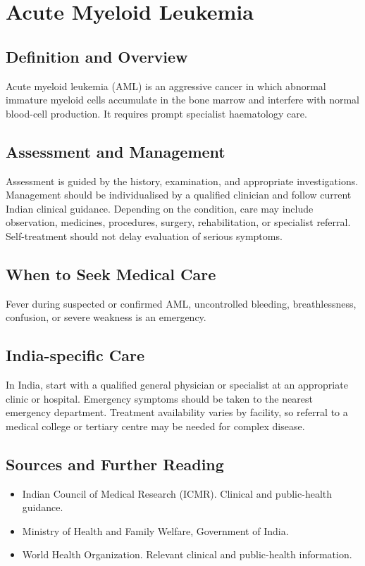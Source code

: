 \chapter{Acute Myeloid Leukemia}

\section*{Definition and Overview}
Acute myeloid leukemia (AML) is an aggressive cancer in which abnormal immature myeloid cells accumulate in the bone marrow and interfere with normal blood-cell production. It requires prompt specialist haematology care.

\section*{Assessment and Management}
Assessment is guided by the history, examination, and appropriate investigations. Management should be individualised by a qualified clinician and follow current Indian clinical guidance. Depending on the condition, care may include observation, medicines, procedures, surgery, rehabilitation, or specialist referral. Self-treatment should not delay evaluation of serious symptoms.

\section*{When to Seek Medical Care}
Fever during suspected or confirmed AML, uncontrolled bleeding, breathlessness, confusion, or severe weakness is an emergency.

\section*{India-specific Care}
In India, start with a qualified general physician or specialist at an appropriate clinic or hospital. Emergency symptoms should be taken to the nearest emergency department. Treatment availability varies by facility, so referral to a medical college or tertiary centre may be needed for complex disease.

\section*{Sources and Further Reading}
\begin{itemize}
    \item Indian Council of Medical Research (ICMR). Clinical and public-health guidance.
    \item Ministry of Health and Family Welfare, Government of India.
    \item World Health Organization. Relevant clinical and public-health information.
\end{itemize}

